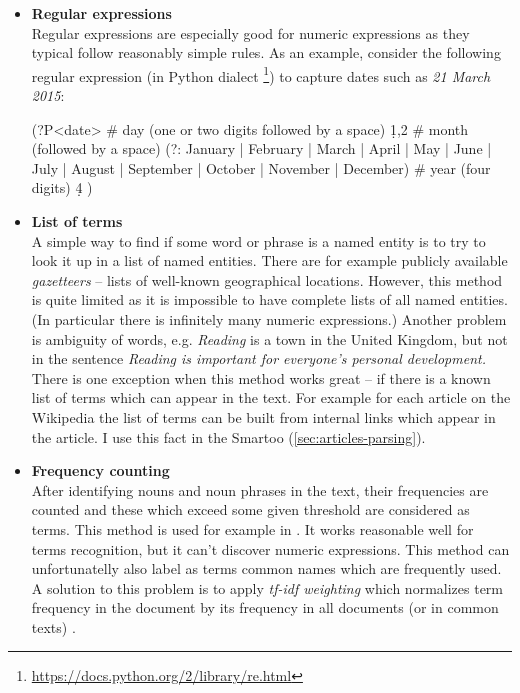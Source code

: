 \documentclass[a4paper, 12pt, twoside]{fithesis2}		%
\renewcommand{\_}{\leavevmode \kern0.07em\vbox{\hrule width0.4em}}
\newcommand{\squarebullet}{\textcolor{black}{\raisebox{0.15em}{\rule{4pt}{4pt}}}}
\newcommand{\emptysquarebullet}{\textcolor{black}{\raisebox{0.10em}{\tiny$\square$}}}
\newenvironment{myItemize}{
  \begin{itemize}[leftmargin=2em,rightmargin=1em,itemsep=\parskip ,parsep=0em,topsep=0em,partopsep=0em]
  \renewcommand{\labelitemi}{\squarebullet}
  \renewcommand{\labelitemii}{\textbullet}
}{
  \end{itemize}
}
\begin{document}
\begin{myItemize}
\item \textbf{Regular expressions}\\
  Regular expressions are especially good for numeric expressions as they typical follow reasonably simple rules.
  As an example, consider the following regular expression (in Python dialect%
  \footnote{\url{https://docs.python.org/2/library/re.html}})
  to capture dates such as \emph{21 March 2015}:
\begin{code}
(?P<date>
    # day (one or two digits followed by a space)
    \d{1,2} \s
    # month (followed by a space)
    (?: January | February | March | April | May | June | July |
         August | September | October | November | December) \s
    # year (four digits)
    \d{4}
)
\end{code}


\item \textbf{List of terms}\\
  A simple way to find if some word or phrase is a named entity is to try to look it up in a list of named entities. There are for example publicly available \textit{gazetteers} -- lists of well-known geographical locations. However, this method is quite limited as it is impossible to have complete lists of all named entities.
(In particular there is infinitely many numeric expressions.)
Another problem is ambiguity of words, e.g. \textit{Reading} is a town in the United Kingdom, but not in the sentence \textit{Reading is important for everyone's personal development.}
  There is one exception when this method works great -- if there is a known list of terms which can appear in the text. For example for each article on the Wikipedia the list of terms can be built from internal links which appear in the article. I use this fact in the Smartoo (\autoref{sec:articles-parsing}).

\item \textbf{Frequency counting}\\
  After identifying nouns and noun phrases in the text, their frequencies are counted and these which exceed some given threshold are considered as terms.
  This method is used for example in \cite{question-gen-mitkov}. It works reasonable well for terms recognition, but it can't discover numeric expressions.
This method can unfortunatelly also label as terms common names which are frequently used.
A solution to this problem is to apply \textit{tf-idf weighting} which normalizes term frequency in the document by its frequency in all documents (or in common texts) \cite[][118]{information-retrieval}.


\end{myItemize}
\end{document}
